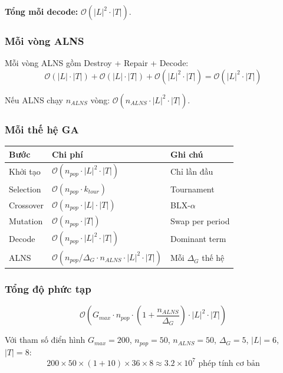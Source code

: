 \textbf{Tổng mỗi decode:} $\mathcal{O}(|L|^2 \cdot |T|)$.

\subsubsection*{Mỗi vòng ALNS}

Mỗi vòng ALNS gồm Destroy + Repair + Decode:
\[
\mathcal{O}(|L| \cdot |T|) + \mathcal{O}(|L| \cdot |T|) + \mathcal{O}(|L|^2 \cdot |T|) = \mathcal{O}(|L|^2 \cdot |T|)
\]

Nếu ALNS chạy $n_{ALNS}$ vòng: $\mathcal{O}(n_{ALNS} \cdot |L|^2 \cdot |T|)$.

\subsubsection*{Mỗi thế hệ GA}

\begin{center}
\begin{tabular}{lll}
\toprule
\textbf{Bước} & \textbf{Chi phí} & \textbf{Ghi chú} \\
\midrule
Khởi tạo & $\mathcal{O}(n_{pop} \cdot |L|^2 \cdot |T|)$ & Chỉ lần đầu \\
Selection & $\mathcal{O}(n_{pop} \cdot k_{tour})$ & Tournament \\
Crossover & $\mathcal{O}(n_{pop} \cdot |L| \cdot |T|)$ & BLX-$\alpha$ \\
Mutation & $\mathcal{O}(n_{pop} \cdot |T|)$ & Swap per period \\
Decode & $\mathcal{O}(n_{pop} \cdot |L|^2 \cdot |T|)$ & Dominant term \\
ALNS & $\mathcal{O}(n_{pop} / \Delta_G \cdot n_{ALNS} \cdot |L|^2 \cdot |T|)$ & Mỗi $\Delta_G$ thế hệ \\
\bottomrule
\end{tabular}
\end{center}

\subsubsection*{Tổng độ phức tạp}

\[
\mathcal{O}\!\left(G_{max} \cdot n_{pop} \cdot \left(1 + \frac{n_{ALNS}}{\Delta_G}\right) \cdot |L|^2 \cdot |T|\right)
\]

Với tham số điển hình $G_{max}=200$, $n_{pop}=50$, $n_{ALNS}=50$, $\Delta_G=5$, $|L|=6$, $|T|=8$:
\[
200 \times 50 \times (1 + 10) \times 36 \times 8 \approx 3.2 \times 10^7 \text{ phép tính cơ bản}
\]

